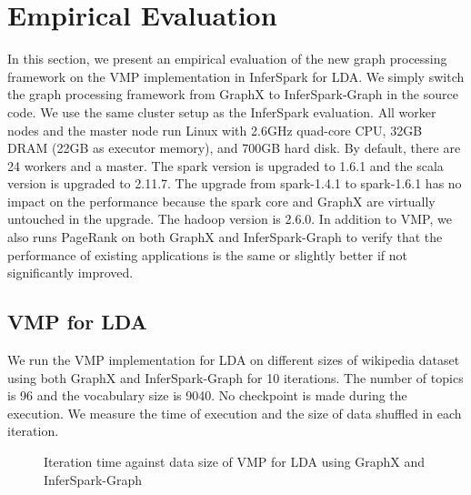 \section{Empirical Evaluation}

In this section, we present an empirical evaluation of the new graph
processing framework on the VMP implementation in InferSpark for LDA. We
simply switch the graph processing framework from GraphX to InferSpark-Graph
in the source code. We use the same cluster setup as the InferSpark
evaluation. All worker nodes and the master node run Linux with 2.6GHz
quad-core CPU, 32GB DRAM (22GB as executor memory), and 700GB hard disk. By
default, there are 24 workers and a master. The spark version is upgraded to
1.6.1 and the scala version is upgraded to 2.11.7. The upgrade from
spark-1.4.1 to spark-1.6.1 has no impact on the performance because the spark
core and GraphX are virtually untouched in the upgrade. The hadoop version is
2.6.0. In addition to VMP, we also runs PageRank on both GraphX and
InferSpark-Graph to verify that the performance of existing applications is the same 
or slightly better if not significantly improved.

\subsection{VMP for LDA}

We run the VMP implementation for LDA on different sizes of wikipedia dataset
using both GraphX and InferSpark-Graph for 10 iterations. The number of topics
is 96 and the vocabulary size is 9040. No checkpoint is made during the
execution. We measure the time of execution and the size of data shuffled in
each iteration.

\begin{figure}[h]
\centering
	\caption{Iteration time against data size of VMP for LDA using GraphX and
	InferSpark-Graph}
	\label{fig:graph_cmp_iteration_time_datasize}
\end{figure}

